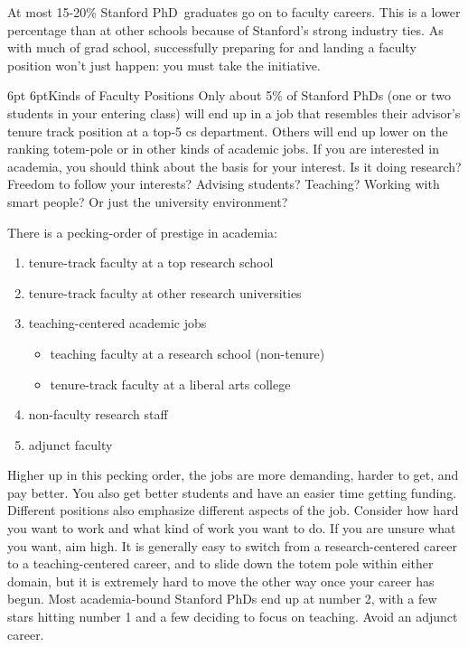 \documentclass[10pt]{book}
\makeatletter
\def\phd{{\sc PhD}}
\renewcommand{\subsection}{\@startsection{subsection}{2}{0mm}%
   {6pt}%
   {6pt}{\normalfont\normalsize\itshape}}
\makeatother
\begin{document}
At most 15-20\% Stanford \phd\ graduates go on to faculty careers.  This is a
lower percentage than at other schools because of Stanford's strong industry
ties. As with much of grad school, successfully preparing for and landing a
faculty position won't just happen: you must take the initiative.

\subsection{Kinds of Faculty Positions}
Only about 5\% of Stanford \phd s (one or two students in your entering class) will end up
in a job that resembles their
advisor's tenure track position at a top-5 {\sc cs} department. Others will end
up lower on the ranking totem-pole or in other kinds of academic jobs. If you
are interested in academia, you should think about the basis for your interest.
Is it doing research?  Freedom to follow your interests?  Advising students?
Teaching?  Working with smart people? Or just the university environment?

There is a pecking-order of prestige in academia:

\begin{enumerate}
\setlength{\itemsep}{1pt}
\setlength{\parskip}{0pt}
\setlength{\parsep}{0pt}
\item tenure-track faculty at a top research school
\item tenure-track faculty at other research universities
\item teaching-centered academic jobs
\begin{itemize}
\item teaching faculty at a research school (non-tenure)
\item tenure-track faculty at a liberal arts college
\end{itemize}
\item non-faculty research staff
\item adjunct faculty
\end{enumerate}

Higher up in this pecking order, the jobs are more demanding, harder to get,
and pay better.  You also get better students and have an easier time getting
funding.  Different positions also emphasize different aspects
of the job.  Consider how hard you want to work and what kind of work you want
to do. If you are unsure what you want, aim high.  It is generally easy
to switch from a research-centered career to a teaching-centered career, and to
slide down the totem pole within either domain, but it is extremely hard to
move the other way once your career has begun.  Most academia-bound Stanford
\phd s end up at number 2, with a few stars hitting number 1 and a few deciding
to focus on teaching.  Avoid an adjunct career.
\end{document}
